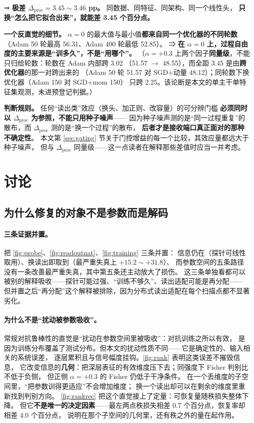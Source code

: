 \documentclass[11pt,a4paper]{ctexart}
\begin{document}
⇒ \textbf{极差 $\Delta_{\text{proc}} = 3.45\sim3.46$ pp。} 同数据、同特征、同架构、同一个线性头，
\textbf{只换“怎么把它拟合出来”，就能差 3.45 个百分点。}

\textbf{一个反直觉的细节。}
$\alpha=0$ 的最大值与最小值\textbf{都来自同一个优化器的不同轮数}（Adam 50 轮最高 56.31、Adam 400 轮最低 52.85）。
⇒ \textbf{在 $\alpha=0$ 上，过程自由度的主要来源是“训多久”，不是“用哪个”。}
（$\alpha=+0.3$ 上两个因子\textbf{同量级}，不能只归给轮数：轮数在 Adam 内部跨 3.02
（51.57 $\to$ 48.55），而全距 3.45 是由\textbf{跨优化器}的那一对跨出来的
（Adam 50 轮 51.57 对 SGD+动量 48.12）；同轮数下换优化器（Adam 150 对 SGD+mom 150）
只跨 2.25。该论断是本文的单主干单特征集观测，未进预登记判据。）

\textbf{判断规则。}
任何“读出类”效应（换头、加正则、改容量）的可分辨门槛
\textbf{必须同时以 $\Delta_{\text{proc}}$ 为参照，不能只用种子噪声}——
因为种子噪声测的是“同一过程重复”的散布，而 $\Delta_{\text{proc}}$ 测的是“换一个过程”的散布，
\textbf{后者才是接收端口真正面对的那种不确定性}。
本文第 \ref{sec:gating} 节关于门控增益的每一个比较，其效应量都远大于种子噪声，
但与 $\Delta_{\text{proc}}$ 同量级——这一点读者在解释那些差值时应当一并考虑。

\section{讨论}
\label{sec:discussion}

\subsection{为什么修复的对象不是参数而是解码}

\paragraph{三条证据并置。}
把 \cref{fig:probe}、\cref{fig:readoutnat}、\cref{fig:training} 三条并置：
信息仍在（探针可线性取用）、换读出即取到（最严重失真上 $+15.2\sim+31.8$）、
而参数空间的五条路径没有一条改善最严重失真，其中第五条还主动放大了损伤。
这三条单独看都可以被别的解释吸收——探针可能过强、“训练不够久”、读出适配可能是再分配——
但并置之后“再分配”这个解释被排除，因为分布式读出适配在每个扫描点都不显著劣化。

\paragraph{为什么不是“扰动被参数吸收”。}
常规对抗鲁棒性的直觉是“扰动在参数空间里被吸收”：对抗训练之所以有效，
是因为训练分布覆盖了测试分布。但本文的扰动性质不同——它是确定性的、输入相关的系统误差，
逐层累积且与信号幅度挂钩。\cref{fig:rank} 表明这类误差不摧毁信息，
它改变信息的\textbf{几何}：把深层表征的有效维度压下去；同强度下 Fisher 判别比不低于负侧，
但正侧 $\alpha=+0.3$ 的 Fisher 仍低于干净条件。
在一个丢维度的子空间里，“把参数训得更适应”不会增加维度；
换一个读出却可以在剩余的维度里重新找到判别方向。
\cref{fig:rankrec} 把这个直觉接上了定量：可恢复量随秩损失整体下降。
但它\textbf{不是唯一的决定因素}——最左两点秩损失相差 0.7 个百分点，恢复率却相差 4.0 个百分点，
说明在那个子空间的几何里，还有秩之外的量在起作用。
\end{document}
